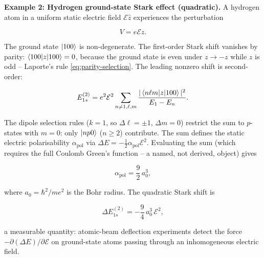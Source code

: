 \medskip\noindent\textbf{Example 2: Hydrogen ground-state Stark effect (quadratic).}
A hydrogen atom in a uniform static electric field $\mathcal{E}\hat{z}$ experiences the perturbation
\begin{linenomath}
\begin{equation*}
V = e\mathcal{E}z.
\end{equation*}
\end{linenomath}
The ground state $\ket{100}$ is non-degenerate. The first-order Stark shift vanishes by parity: $\braket{100|z|100}=0$, because the ground state is even under $z \to -z$ while $z$ is odd -- Laporte's rule \eqref{eq:parity-selection}. The leading nonzero shift is second-order:
\begin{linenomath}
\begin{equation}
E_{1s}^{(2)} = e^{2}\mathcal{E}^{2}\sum_{n\neq 1,\ell,m}\frac{|\braket{n\ell m|z|100}|^{2}}{E_{1}-E_{n}}.
\label{eq:stark-quadratic-polarizability}
\end{equation}
\end{linenomath}
The dipole selection rules ($k=1$, so $\Delta\ell = \pm1$, $\Delta m = 0$) restrict the sum to $p$-states with $m=0$: only $\ket{np0}$ ($n \ge 2$) contribute. The sum defines the static electric polarisability $\alpha_{\text{pol}}$ via $\Delta E = -\tfrac12\alpha_{\text{pol}}\mathcal{E}^{2}$. Evaluating the sum (which requires the full Coulomb Green's function -- a named, not derived, object) gives
\begin{linenomath}
\begin{equation*}
\alpha_{\text{pol}} = \frac{9}{2}\,a_{0}^{3},
\end{equation*}
\end{linenomath}
where $a_{0} = \hbar^{2}/me^{2}$ is the Bohr radius. The quadratic Stark shift is
\begin{linenomath}
\begin{equation*}
\Delta E_{1s}^{(2)} = -\frac{9}{4}\,a_{0}^{3}\,\mathcal{E}^{2},
\end{equation*}
\end{linenomath}
a measurable quantity: atomic-beam deflection experiments detect the force $-\partial(\Delta E)/\partial\mathcal{E}$ on ground-state atoms passing through an inhomogeneous electric field.

